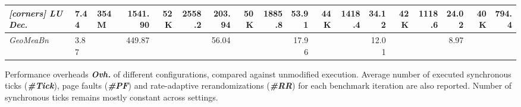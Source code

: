 \begin{adjustbox}{angle=90}
\begin{threeparttable}
\begin{NiceTabular}{@{}>{\it }lll*{15}r@{}}[corners]
			LU Dec.                     & 7.44                       & 354M & 1541.90                                         & 52K  & 2558.2  & 203.94 & 50K & 1885.8  & 53.91 & 44K & 1418.4 & 34.12 & 42K & 1118.6 & 24.02 & 40K & 794.4  \\
			\midrule
			GeoMeaBn                    & 3.87                       &      & 449.87                                          &      &         & 56.04  &     &         & 17.96 &     &        & 12.01 &     &        & 8.97  &     &        \\
			\bottomrule
		\end{NiceTabular}
		\centering
		\caption{Performance overheads \textbf{\emph{Ovh.}} of different \thename configurations, compared against unmodified \nbench execution.
			Average number of executed synchronous ticks (\textbf{\emph{\#Tick}}), page faults (\emph{\textbf{\#PF}}) and rate-adaptive rerandomizations (\emph{\textbf{\#RR}}) for each benchmark iteration are also reported. Number of synchronous ticks remains mostly constant across settings.}\label{tab:nbench}
	\end{threeparttable}
\end{adjustbox}
